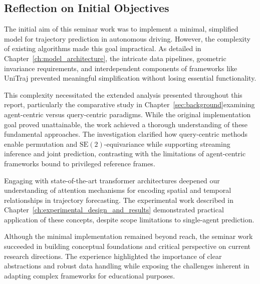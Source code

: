 \subsection{Reflection on Initial Objectives}
\label{sec:conclusion_objectives}

The initial aim of this seminar work was to implement a minimal, simplified model for trajectory prediction in autonomous driving. However, the complexity of existing algorithms made this goal impractical. As detailed in Chapter~\ref{ch:model_architecture}, the intricate data pipelines, geometric invariance requirements, and interdependent components of frameworks like UniTraj prevented meaningful simplification without losing essential functionality.

This complexity necessitated the extended analysis presented throughout this report, particularly the comparative study in Chapter~\ref{sec:background}examining agent-centric versus query-centric paradigms. While the original implementation goal proved unattainable, the work achieved a thorough understanding of these fundamental approaches. The investigation clarified how query-centric methods enable permutation and $\mathrm{SE}(2)$-equivariance while supporting streaming inference and joint prediction, contrasting with the limitations of agent-centric frameworks bound to privileged reference frames.

Engaging with state-of-the-art transformer architectures deepened our understanding of attention mechanisms for encoding spatial and temporal relationships in trajectory forecasting. The experimental work described in Chapter~\ref{ch:experimental_design_and_results} demonstrated practical application of these concepts, despite scope limitations to single-agent prediction.

Although the minimal implementation remained beyond reach, the seminar work succeeded in building conceptual foundations and critical perspective on current research directions. The experience highlighted the importance of clear abstractions and robust data handling while exposing the challenges inherent in adapting complex frameworks for educational purposes.
